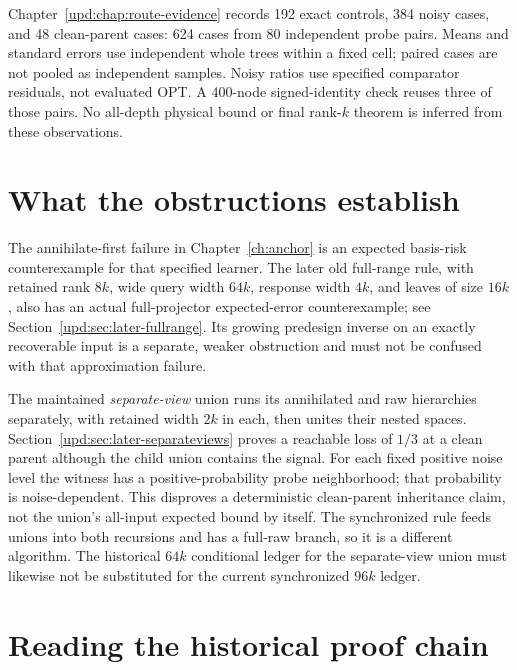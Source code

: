 \documentclass[11pt,oneside,openany,a4paper]{book}
\numberwithin{equation}{chapter}
\theoremstyle{definition}
\theoremstyle{remark}
\begin{document}
\begin{description}[style=nextline,leftmargin=0pt]
\item[Actual numerical checks: finite evidence.]
Chapter~\ref{upd:chap:route-evidence} records 192 exact controls,
384 noisy cases, and 48 clean-parent cases: 624 cases from 80
independent probe pairs.  Means and standard errors use independent
whole trees within a fixed cell; paired cases are not pooled as
independent samples.  Noisy ratios use specified comparator residuals,
not evaluated OPT.  A 400-node signed-identity check reuses three of
those pairs.  No all-depth physical bound or final rank-$k$ theorem is
inferred from these observations.
\end{description}

\section*{What the obstructions establish}

The annihilate-first failure in Chapter~\ref{ch:anchor} is an
expected basis-risk counterexample for that specified learner.  The
later old full-range rule, with retained rank $8k$, wide query width
$64k$, response width $4k$, and leaves of size $16k$, also has an
actual full-projector expected-error counterexample; see
Section~\ref{upd:sec:later-fullrange}.  Its growing predesign inverse
on an exactly recoverable input is a separate, weaker obstruction and
must not be confused with that approximation failure.

The maintained \emph{separate-view} union runs its annihilated and raw
hierarchies separately, with retained width $2k$ in each, then unites
their nested spaces.  Section~\ref{upd:sec:later-separateviews} proves
a reachable loss of $1/3$ at a clean parent although the child union
contains the signal.  For each fixed positive noise level the witness
has a positive-probability probe neighborhood; that probability is
noise-dependent.  This disproves a deterministic clean-parent
inheritance claim, not the union's all-input expected bound by itself.
The synchronized rule feeds unions into both recursions and has a
full-raw branch, so it is a different algorithm.  The historical
$64k$ conditional ledger for the separate-view union must likewise
not be substituted for the current synchronized $96k$ ledger.

\section*{Reading the historical proof chain}
\end{document}
